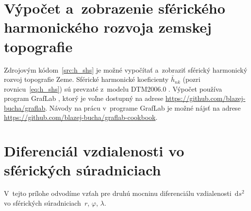 \documentclass[a4paper, 12pt]{book}
\newcommand{\diff}{\mathrm d}
\begin{document}
\chapter{Výpočet a~zobrazenie sférického harmonického rozvoja zemskej
topografie}
\label{app:shs_topography}

Zdrojovým kódom~\ref{src:h_shs} je možné vypočítať a~zobraziť sférický 
harmonický rozvoj topografie Zeme.  Sférické harmonické koeficienty 
$\bar{h}_{nk}$ (pozri rovnicu~\ref{eq:h_shs}) sú prevzaté z~modelu DTM2006.0 
\parencite{DTM2006}.  Výpočet používa program GrafLab \parencite{GrafLab}, 
ktorý je voľne dostupný na adrese 
\url{https://github.com/blazej-bucha/graflab}.  Návody na prácu v~programe 
GrafLab je možné nájsť na adrese 
\url{https://github.com/blazej-bucha/graflab-cookbook}.








\chapter{Diferenciál vzdialenosti vo sférických súradniciach}
\label{app:differential_of_line_element_in_sph_coords}

V~tejto prílohe odvodíme vzťah pre druhú mocninu diferenciálu 
vzdialenosti~$\diff s^2$ vo sférických súradniciach~$r$, $\varphi$, $\lambda$.
\end{document}
